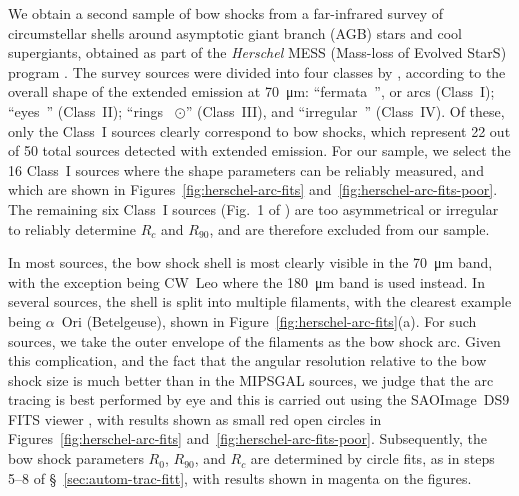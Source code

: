 We obtain a second sample of bow shocks from a far-infrared survey
\citep{Cox:2012a} of circumstellar shells around asymptotic giant
branch (AGB) stars and cool supergiants, obtained as part of the
\textit{Herschel} MESS (Mass-loss of Evolved StarS) program
\citep{Groenewegen:2011a}.  The survey sources were divided into four
classes by \citeauthor{Cox:2012a}, according to the overall shape of
the extended emission at \SI{70}{\um}: ``fermata~\textfermata'', or
arcs (Class~I); ``eyes~\faEye'' (Class~II); ``rings~{\Large
  \(\odot\)}'' (Class~III), and ``irregular~\staveXXV'' (Class~IV).  Of
these, only the Class~I sources clearly correspond to bow shocks,
which represent 22 out of 50 total sources detected with extended
emission.  For our sample, we select the 16 Class~I sources where the
shape parameters can be reliably measured, and which are shown in
Figures~\ref{fig:herschel-arc-fits}
and~\ref{fig:herschel-arc-fits-poor}. The remaining six Class~I
sources (Fig.~1 of \citealp{Cox:2012a}) are too asymmetrical or
irregular to reliably determine \(R_{c}\) and \(R_{90}\), and are
therefore excluded from our sample.

In most sources, the bow shock shell is most clearly visible in the
\SI{70}{\um} band, with the exception being CW~Leo where the
\SI{180}{\um} band is used instead.  In several sources, the shell is
split into multiple filaments, with the clearest example being
\(\alpha\)~Ori (Betelgeuse), shown in
Figure~\ref{fig:herschel-arc-fits}(a).  For such sources, we take the
outer envelope of the filaments as the bow shock arc.  Given this
complication, and the fact that the angular resolution relative to the
bow shock size is much better than in the MIPSGAL sources, we judge
that the arc tracing is best performed by eye and this is carried out
using the SAOImage~DS9 FITS viewer \citep{Joye:2003a}, with results
shown as small red open circles in Figures~\ref{fig:herschel-arc-fits}
and~\ref{fig:herschel-arc-fits-poor}.  Subsequently, the bow shock
parameters \(R_0\), \(R_{90}\), and \(R_c\) are determined by circle
fits, as in steps 5--8 of \S~\ref{sec:autom-trac-fitt}, with results
shown in magenta on the figures.

